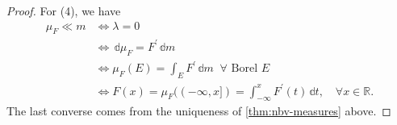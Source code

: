 \begin{proof}

	For (4), we have
	\[
		\begin{split}
			\mu_F \ll m & \iff \lambda = 0 \\
			&\iff \,\mathbb{d}\mu_F = F^\prime \,\mathbb{d}m                                          \\
			& \iff \mu_F(E) = \int_E F^\prime  \,\mathbb{d}m \;\; \forall \text{ Borel } E                               \\
			& \iff F(x) = \mu_F((-\infty,x]) = \int_{-\infty}^x F^\prime (t) \,\mathbb{d}t,\quad \forall x \in \mathbb{R}.
		\end{split}
	\]
	The last converse comes from the uniqueness of \autoref{thm:nbv-measures} above.
\end{proof}